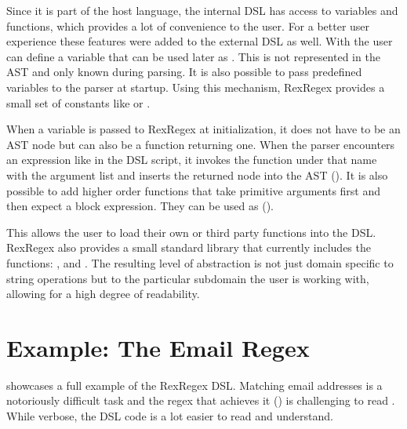 Since it is part of the host language, the internal DSL has access to variables and functions, which provides a lot of convenience to the user. For a better user experience these features were added to the external DSL as well. With  the user can define a variable that can be used later as . This is not represented in the AST and only known during parsing. It is also possible to pass predefined variables  to the parser at startup. Using this mechanism, RexRegex provides a small set of constants like  or . 

When a variable is passed to RexRegex at initialization, it does not have to be an AST node but can also be a function returning one. When the parser encounters an expression like  in the DSL script, it invokes the function under that name with the argument list and inserts the returned node into the AST (). It is also possible to add higher order functions  that take primitive arguments first and then expect a block expression. They can be used as  ().

This allows the user to load their own or third party functions into the DSL. RexRegex also provides a small standard library that currently includes the functions: ,  and . The resulting level of abstraction is not just domain specific to string operations but to the particular subdomain the user is working with, allowing for a high degree of readability.

\section{Example: The Email Regex}

 showcases a full example of the RexRegex DSL. Matching email addresses is a notoriously difficult task and the regex that achieves it () is challenging to read \cite{EmailRegex}. While verbose, the DSL code is a lot easier to read and understand.

